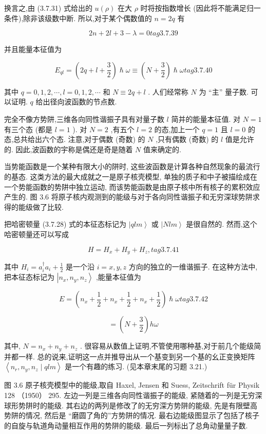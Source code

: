 换言之,由 (3.7.31) 式给出的 $u\left( \rho \right)$ 在大 $\rho$ 时将按指数增长 (因此将不能满足归一条件),除非该级数中断. 所以,对于某个偶数值的 $n = {2q}$ 有

$$
{2n} + {2l} + 3 - \lambda = 0 tag{3. 7.39}
$$

并且能量本征值为

$$
{E}_{ql} = \left( {{2q} + l + \frac{3}{2}}\right) \hslash \omega \equiv \left( {N + \frac{3}{2}}\right) \hslash \omega tag{3. 7.40}
$$

其中 $q = 0,1,2,\cdots, l = 0,1,2,\cdots$ 和 $N \equiv {2q} + l$ . 人们经常称 $N$ 为 “主” 量子数. 可以证明. $q$ 给出径向波函数的节点数.

完全不像方势阱,三维各向同性谐振子具有对量子数 $l$ 简并的能量本征值. 对 $N = 1$ 有三个态 (都是 $l = 1$ ). 对 $N = 2$ ,有五个 $l = 2$ 的态,加上一个 $q = 1$ 且 $l = 0$ 的态,总共给出六个态. 注意,对于偶数 (奇数) 的 $N$ ,只有偶数 (奇数) 的 $l$ 值是允许的. 因此,波函数的宇称是偶还是奇是随着 $N$ 值来确定的.

当势能函数是一个某种有限大小的阱时, 这些波函数是计算各种自然现象的最流行的基态. 这类方法的最大成就之一是原子核壳模型, 单独的质子和中子被描绘成在一个势能函数的势阱中独立运动, 而该势能函数是由原子核中所有核子的累积效应产生的. 图 3.6 将原子核内观测到的能级与对于各向同性谐振子和无穷深球势阱求得的能级做了比较.

把哈密顿量 (3.7.28) 式的本征态标记为 $\left| {qlm}\right\rangle$ 或 $\left| {Nlm}\right\rangle$ 是很自然的. 然而,这个哈密顿量还可以写成

$$
H = {H}_{x} + {H}_{y} + {H}_{z}, tag{3. 7.41}
$$

其中 ${H}_{i} = {a}_{i}^{ \dagger }{a}_{i} + \frac{1}{2}$ 是一个沿 $i = x, y, z$ 方向的独立的一维谐振子. 在这种方法中,把本征态标记为 $\left| {{n}_{x},{n}_{y},{n}_{z}}\right\rangle$ ,能量本征值为

$$
E = \left( {{n}_{x} + \frac{1}{2} + {n}_{x} + \frac{1}{2} + {n}_{x} + \frac{1}{2}}\right) \hslash \omega tag{3. 7.42}
$$

$$
= \left( {N + \frac{3}{2}}\right) {h\omega }
$$

其中, $N = {n}_{x} + {n}_{y} + {n}_{z}$ . 很容易从数值上证明,不管使用哪种基,对于前几个能级简并都一样. 总的说来,证明这一点并推导出从一个基变到另一个基的幺正变换矩阵 $\left\langle {{n}_{r},{n}_{y},{n}_{z} \mid {qlm}}\right\rangle$ 是一个有趣的练习. (见本章末尾的习题 3.21.)

图 3.6 原子核壳模型中的能级,取自 Haxel, Jensen 和 Suess, Zeitschrift für Physik 128 （1950） 295. 左边一列是三维各向同性谐振子的能级, 紧随着的一列是无穷深球形势阱时的能级. 其右边的两列是修改了的无穷深方势阱的能级, 先是有限壁高势阱的情况, 然后是 “磨圆了角的”方势阱的情况. 最右边能级图显示了包括了核子的自旋与轨道角动量相互作用的势阱的能级. 最后一列标出了总角动量量子数.

